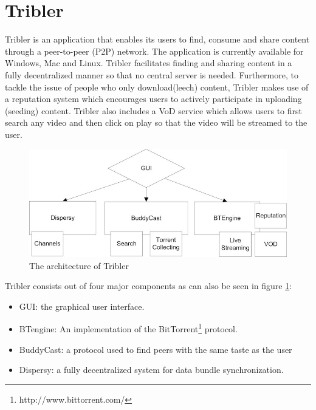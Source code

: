 \section{Tribler}
Tribler is an application that enables its users to find, consume and share content through a peer-to-peer (P2P) network. The application is currently available for Windows, Mac and Linux. Tribler facilitates finding and sharing content in a fully decentralized manner so that no central server is needed. Furthermore, to tackle the issue of people who only download(leech) content, Tribler makes use of a reputation system which encourages users to actively participate in uploading (seeding) content. Tribler also includes a VoD service which allows users to first search any video and then click on play so that the video will be streamed to the user.

\begin{figure}[h]
	\centering
	\includegraphics[scale=0.4]{vod/images/tribler_component_overview.jpg}
	\caption{The architecture of Tribler\protect\footnotemark}
	\label{fig:tribler_components}
\end{figure}
\noindent Tribler consists out of four major components as can also be seen in figure \ref{fig:tribler_components}:
\begin{itemize}
	\item GUI: the graphical user interface.
	\item BTengine: An implementation of the BitTorrent\footnote{http://www.bittorrent.com/} protocol.
	\item BuddyCast: a protocol used to find peers with the same taste as the user\cite{tribler}
	\item Dispersy: a fully decentralized system for data bundle synchronization\cite{dispersy}.
\end{itemize}

